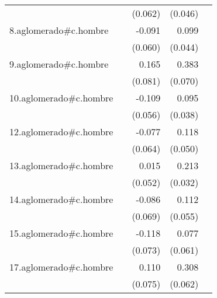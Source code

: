 {\begin{longtable}{l*{4}{D{.}{.}{-1}}}
            &                     &     (0.062)         &     (0.046)         &                     \\
\addlinespace
8.aglomerado#c.hombre&                     &      -0.091         &       0.099\sym{*}  &                     \\
            &                     &     (0.060)         &     (0.044)         &                     \\
\addlinespace
9.aglomerado#c.hombre&                     &       0.165\sym{*}  &       0.383\sym{***}&                     \\
            &                     &     (0.081)         &     (0.070)         &                     \\
\addlinespace
10.aglomerado#c.hombre&                     &      -0.109         &       0.095\sym{*}  &                     \\
            &                     &     (0.056)         &     (0.038)         &                     \\
\addlinespace
12.aglomerado#c.hombre&                     &      -0.077         &       0.118\sym{*}  &                     \\
            &                     &     (0.064)         &     (0.050)         &                     \\
\addlinespace
13.aglomerado#c.hombre&                     &       0.015         &       0.213\sym{***}&                     \\
            &                     &     (0.052)         &     (0.032)         &                     \\
\addlinespace
14.aglomerado#c.hombre&                     &      -0.086         &       0.112\sym{*}  &                     \\
            &                     &     (0.069)         &     (0.055)         &                     \\
\addlinespace
15.aglomerado#c.hombre&                     &      -0.118         &       0.077         &                     \\
            &                     &     (0.073)         &     (0.061)         &                     \\
\addlinespace
17.aglomerado#c.hombre&                     &       0.110         &       0.308\sym{***}&                     \\
            &                     &     (0.075)         &     (0.062)         &                     \\

\end{longtable}}
